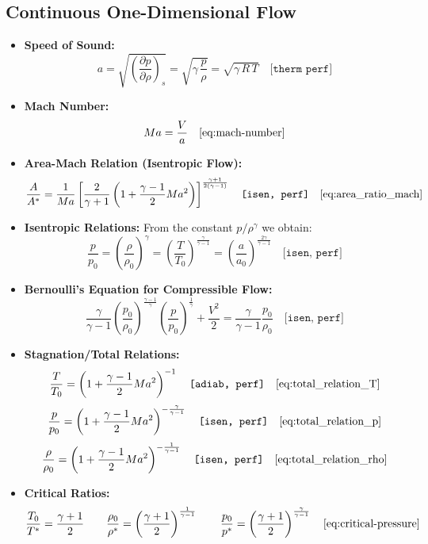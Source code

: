 \subsection*{Continuous One-Dimensional Flow}
\begin{itemize}
    \item \textbf{Speed of Sound:}  
    $$
	    a = \sqrt{\left(\frac{\partial p}{\partial \rho}\right)_s} = \sqrt{\gamma\,\frac{p}{\rho}} = \sqrt{\gamma\,R\,T} \quad \texttt{[therm perf]}
    $$
    \item \textbf{Mach Number:}  
    $$
	    Ma = \frac{V}{a}\quad\eqref{eq:mach-number}
    $$
    \item \textbf{Area-Mach Relation (Isentropic Flow):}  
    $$
	    \frac{A}{A^*} = \frac{1}{Ma}\left[\frac{2}{\gamma+1}\left(1+\frac{\gamma-1}{2}Ma^2\right)\right]^{\frac{\gamma+1}{2(\gamma-1)}} \quad \texttt{[isen, perf]}\quad\eqref{eq:area_ratio_mach}
    $$
    \item \textbf{Isentropic Relations:}  
    From the constant $ p/\rho^\gamma $ we obtain:
    $$
	    \frac{p}{p_0} = \left(\frac{\rho}{\rho_0}\right)^\gamma = \left(\frac{T}{T_0}\right)^{\frac{\gamma}{\gamma-1}} = \left(\frac{a}{a_0}\right)^{\frac{2\gamma}{\gamma-1}} \quad \texttt{[isen, perf]}
    $$
    \item \textbf{Bernoulli’s Equation for Compressible Flow:}  
    $$
	    \frac{\gamma}{\gamma-1}\left(\frac{p_0}{\rho_0}\right)^{\frac{\gamma-1}{\gamma}}\left(\frac{p}{p_0}\right)^{\frac{1}{\gamma}} + \frac{V^2}{2} = \frac{\gamma}{\gamma-1}\frac{p_0}{\rho_0} \quad \texttt{[isen, perf]}
    $$
    \item \textbf{Stagnation/Total Relations:}  
    $$
	    \frac{T}{T_0} = \left(1+\frac{\gamma-1}{2}Ma^2\right)^{-1} \quad \texttt{[adiab, perf]} \quad \eqref{eq:total_relation_T}
    $$
    $$
	    \frac{p}{p_0} = \left(1+\frac{\gamma-1}{2}Ma^2\right)^{-\frac{\gamma}{\gamma-1}} \quad \texttt{[isen, perf]} \quad \eqref{eq:total_relation_p}
    $$
    $$
	    \frac{\rho}{\rho_0} = \left(1+\frac{\gamma-1}{2}Ma^2\right)^{-\frac{1}{\gamma-1}} \quad \texttt{[isen, perf]} \quad \eqref{eq:total_relation_rho}
    $$
    \item \textbf{Critical Ratios:}  
    $$
	    \frac{T_0}{T^*} = \frac{\gamma+1}{2}
			\qquad
	    \frac{\rho_0}{\rho^*} = \left(\frac{\gamma+1}{2}\right)^{\frac{1}{\gamma-1}}
			\qquad
	    \frac{p_0}{p^*} = \left(\frac{\gamma+1}{2}\right)^{\frac{\gamma}{\gamma-1}} \quad \eqref{eq:critical-pressure}
    $$
\end{itemize}

